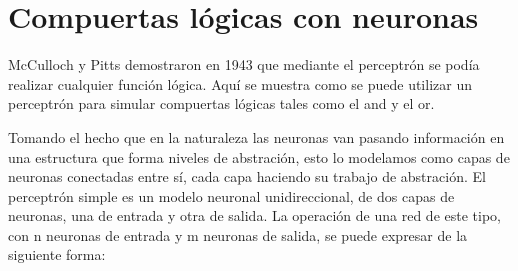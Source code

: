 \section{Compuertas lógicas con neuronas}

McCulloch y Pitts demostraron en 1943 que mediante  el perceptrón se podía realizar cualquier función lógica.
Aquí se muestra como se puede utilizar un perceptrón para simular compuertas lógicas tales como el and y el or.

Tomando el hecho que en la naturaleza las neuronas van pasando información en una estructura que forma niveles de abstración, esto lo modelamos como capas de neuronas conectadas entre sí, cada capa haciendo su trabajo de abstración.
El perceptrón simple es un modelo neuronal unidireccional, de dos capas de neuronas, una de entrada y otra de salida. La operación de una red de este tipo, con n neuronas de entrada y m neuronas de salida, se puede expresar de la siguiente forma:
